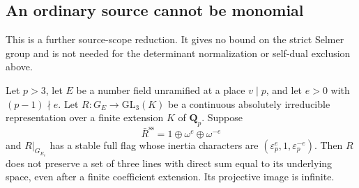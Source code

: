 \subsection{An ordinary source cannot be monomial}
\label{sec:kt-ordinary-imprimitive-exclusion}

This is a further source-scope reduction.  It gives no bound on
the strict Selmer group and is not needed for the determinant
normalization or self-dual exclusion above.

\begin{lemma}
Let $p>3$, let $E$ be a number field unramified at a place
$v\mid p$, and let $e>0$ with $(p-1)\nmid e$.
Let $R:G_E\to\mathrm{GL}_3(K)$ be a continuous absolutely
irreducible representation over a finite extension $K$ of
$\mathbf Q_p$.  Suppose
\[
              \bar R^{\mathrm{ss}}=1\oplus\omega^e
                                            \oplus\omega^{-e}
                                                               \tag{IM.1}
\]
and $R|_{G_{E_v}}$ has a stable full flag whose inertia
characters are $(\varepsilon_p^e,1,\varepsilon_p^{-e})$.
Then $R$ does not preserve a set of three lines with direct sum
equal to its underlying space, even after a finite coefficient
extension.  Its projective image is infinite.
\end{lemma}

